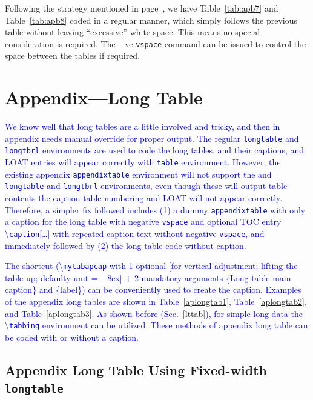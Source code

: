 \documentclass[phd]{ndsu-thesis-2022}
\newcommand\italk[1]{\textcolor{blue}{#1}}  %
\newcommand\cmd[1]{\textbackslash\texttt{#1}}  %
\newcommand\vb[1]{\textcolor{blue}{\texttt{#1}}}%
\begin{document}
{\color{blue} Following the strategy mentioned in page~\pageref{ttab}, we have Table~\ref{tab:apb7} and Table~\ref{tab:apb8} coded in a regular manner, which simply follows the previous table without leaving ``excessive'' white space. This means no special consideration is required. The $-$ve \texttt{vspace} command can be issued to control the space between the tables if required. 
} 
 

\section{Appendix---Long Table}

\italk{We know well that long tables are a little involved and tricky, and then in appendix needs manual override for proper output. The regular \vb{longtable} and \vb{longtbrl} environments are used to code the long tables, and their captions, and LOAT entries will appear correctly with \vb{table} environment. However, the existing appendix \vb{appendixtable} environment will not support the and \vb{longtable} and \vb{longtbrl} environments, even though these will output table contents the caption table numbering and LOAT will not appear correctly. Therefore, a simpler fix followed includes (1) a dummy \vb{appendixtable} with only a caption for the long table with negative \vb{vspace} and optional TOC entry \cmd{caption}[\ldots] with repeated caption text without negative \vb{vspace}, and immediately followed by (2) the long table code without caption.} 

\italk{The shortcut (\cmd{mytabapcap} with 1 optional [for vertical adjustment; lifting the table up; defaulty unit = $-8$ex] + 2 mandatory arguments \{Long table main caption\} and \{label\}) can be conveniently used to create the caption. Examples of the appendix long tables are shown in Table~\ref{aplongtab1}, Table~\ref{aplongtab2}, and Table~\ref{aplongtab3}. As shown before (Sec.~\ref{lttab}), for simple long data the \cmd{tabbing} environment can be utilized. These methods of appendix long table can be coded with or without a caption.}  


\subsection{Appendix Long Table Using Fixed-width \texttt{longtable}}

\end{document}
